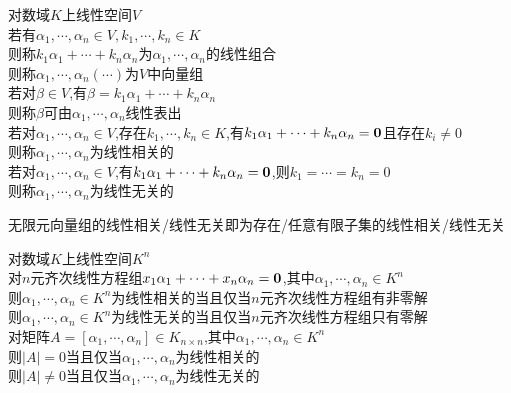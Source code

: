 \begin{dingyi}
对数域$K$上线性空间$V$\\
若有$\alpha_1,\cdots,\alpha_n\in V,k_1,\cdots,k_n\in K$\\
则称$k_1\alpha_1+\cdots+k_n\alpha_n$为$\alpha_1,\cdots,\alpha_n$的线性组合\\
则称$\alpha_1,\cdots,\alpha_n(\cdots)$为$V$中向量组\\
若对$\beta\in V$,有$\beta=k_1\alpha_1+\cdots+k_n\alpha_n$\\
则称$\beta$可由$\alpha_1,\cdots,\alpha_n$线性表出\\
若对$\alpha_1,\cdots,\alpha_n\in V$,存在$k_1,\cdots,k_n\in K$,有$k_1\alpha_1+\cdots+k_n\alpha_n={\bf0}$且存在$k_i\neq0$\\
则称$\alpha_1,\cdots,\alpha_n$为线性相关的\\
若对$\alpha_1,\cdots,\alpha_n\in V$,有$k_1\alpha_1+\cdots+k_n\alpha_n={\bf0}$,则$k_1=\cdots=k_n=0$\\
则称$\alpha_1,\cdots,\alpha_n$为线性无关的
\end{dingyi}

\begin{zhu}
无限元向量组的线性相关/线性无关即为存在/任意有限子集的线性相关/线性无关
\end{zhu}

\begin{dingyi}
对数域$K$上线性空间$K^n$\\
对$n$元齐次线性方程组$x_1\alpha_1+\cdots+x_n\alpha_n={\bf0}$,其中$\alpha_1,\cdots,\alpha_n\in K^n$\\
则$\alpha_1,\cdots,\alpha_n\in K^n$为线性相关的当且仅当$n$元齐次线性方程组有非零解\\
则$\alpha_1,\cdots,\alpha_n\in K^n$为线性无关的当且仅当$n$元齐次线性方程组只有零解\\
对矩阵$A=[\alpha_1,\cdots,\alpha_n]\in K_{n\times n}$,其中$\alpha_1,\cdots,\alpha_n\in K^n$\\
则$|A|=0$当且仅当$\alpha_1,\cdots,\alpha_n$为线性相关的\\
则$|A|\neq0$当且仅当$\alpha_1,\cdots,\alpha_n$为线性无关的
\end{dingyi}

